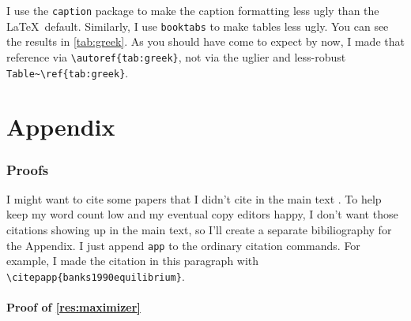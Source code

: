 \documentclass[12pt]{article}
\begin{document}
I use the \verb|caption| package to make the caption formatting less ugly than the \LaTeX\ default.
Similarly, I use \verb|booktabs| to make tables less ugly.
You can see the results in \autoref{tab:greek}.
As you should have come to expect by now, I made that reference via \verb|\autoref{tab:greek}|, not via the uglier and less-robust \verb|Table~\ref{tab:greek}|.


\singlespacing





\clearpage
\appendix
\onehalfspacing

\renewcommand{\partname}{}
\renewcommand{\thepart}{}
\part{Appendix}
\localtableofcontents

\setcounter{page}{1}
\setcounter{lemma}{0}
\setcounter{corollary}{0}
\setcounter{proposition}{0}
\setcounter{equation}{0}
\setcounter{figure}{0}
\setcounter{table}{0}

\renewcommand{\thelemma}{A.\arabic{lemma}}
\renewcommand{\thecorollary}{A.\arabic{corollary}}
\renewcommand{\theproposition}{A.\arabic{proposition}}
\renewcommand{\theequation}{A.\arabic{equation}}
\renewcommand{\thefigure}{A.\arabic{figure}}
\renewcommand{\thetable}{A.\arabic{table}}

\section{Proofs}

I might want to cite some papers that I didn't cite in the main text .
To help keep my word count low and my eventual copy editors happy, I don't want those citations showing up in the main text, so I'll create a separate bibiliography for the Appendix.
I just append \verb|app| to the ordinary citation commands.
For example, I made the citation in this paragraph with \verb|\citepapp{banks1990equilibrium}|.

\subsection{Proof of \autoref{res:maximizer}}
\end{document}
